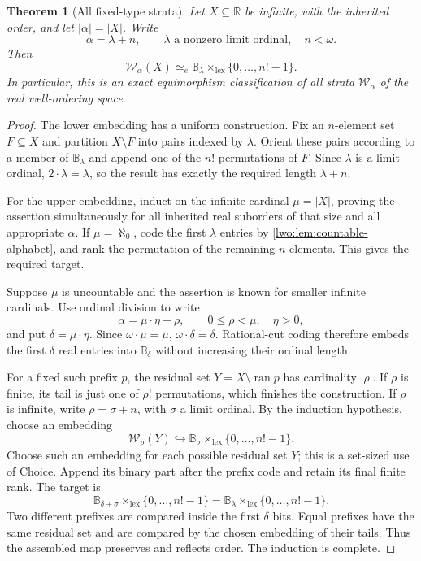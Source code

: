 \documentclass[11pt,a4paper]{article}
\newtheorem{theorem}{Theorem}[section]
\theoremstyle{definition}
\theoremstyle{remark}
\newcommand{\R}{\mathbb R}
\newcommand{\W}{\mathcal W}
\newcommand{\B}{\mathbb B}
\newcommand{\lex}{\mathrm{lex}}
\newcommand{\ran}{\operatorname{ran}}
\newcommand{\emb}{\hookrightarrow}
\newcommand{\equi}{\mathrel{\simeq_{\!e}}}
\begin{document}
\begin{theorem}[All fixed-type strata]\label{lwo:thm:all-strata}
Let $X\subseteq\R$ be infinite, with the inherited order, and let
$|\alpha|=|X|$. Write
\[
                  \alpha=\lambda+n,
       \qquad \lambda\text{ a nonzero limit ordinal},\quad n<\omega.
\]
Then
\begin{equation}\label{lwo:eq:all-strata}
                   \W_\alpha(X)\equi
                         \B_\lambda\times_{\lex}\{0,\ldots,n!-1\}.
\end{equation}
In particular, this is an exact equimorphism classification of all strata
$\W_\alpha$ of the real well-ordering space.
\end{theorem}
\begin{proof}
The lower embedding has a uniform construction. Fix an $n$-element set
$F\subseteq X$ and partition $X\setminus F$ into pairs indexed by
$\lambda$. Orient these pairs according to a member of $\B_\lambda$ and
append one of the $n!$ permutations of $F$. Since $\lambda$ is a limit
ordinal, $2\cdot\lambda=\lambda$, so the result has exactly the required
length $\lambda+n$.

For the upper embedding, induct on the infinite cardinal $\mu=|X|$,
proving the assertion simultaneously for all inherited real suborders of
that size and all appropriate $\alpha$. If $\mu=\aleph_0$, code the first
$\lambda$ entries by \cref{lwo:lem:countable-alphabet}, and rank the permutation
of the remaining $n$ elements. This gives the required target.

Suppose $\mu$ is uncountable and the assertion is known for smaller infinite
cardinals. Use ordinal division to write
\[
                         \alpha=\mu\cdot\eta+\rho,
                  \qquad 0\leq\rho<\mu,\quad\eta>0,
\]
and put $\delta=\mu\cdot\eta$. Since $\omega\cdot\mu=\mu$,
$\omega\cdot\delta=\delta$. Rational-cut coding therefore embeds the
first $\delta$ real entries into $\B_\delta$ without increasing their
ordinal length.

For a fixed such prefix $p$, the residual set
$Y=X\setminus\ran p$ has cardinality $|\rho|$. If $\rho$ is finite, its
tail is just one of $\rho!$ permutations, which finishes the construction.
If $\rho$ is infinite, write $\rho=\sigma+n$, with $\sigma$ a limit
ordinal. By the induction hypothesis, choose an embedding
\[
             \W_\rho(Y)\emb\B_\sigma\times_{\lex}\{0,\ldots,n!-1\}.
\]
Choose such an embedding for each possible residual set $Y$; this is a
set-sized use of Choice. Append its binary part after the prefix code and
retain its final finite rank. The target is
\[
          \B_{\delta+\sigma}\times_{\lex}\{0,\ldots,n!-1\}
                =\B_\lambda\times_{\lex}\{0,\ldots,n!-1\}.
\]
Two different prefixes are compared inside the first $\delta$ bits. Equal
prefixes have the same residual set and are compared by the chosen
embedding of their tails. Thus the assembled map preserves and reflects
order. The induction is complete.
\end{proof}
\end{document}
